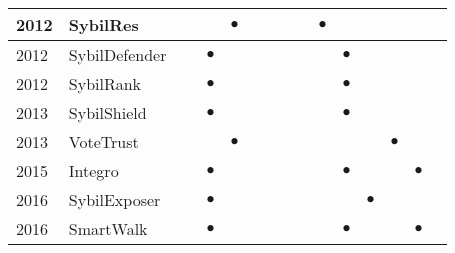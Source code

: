 \begin{table*}[]
\begin{tabular}{||l||l||c|c|c||c|c|c|c|c|c|c|c|c|c||}
  2012 & SybilRes~\cite{delaviz2012sybilres}                  &           &           & $\bullet$ &           &           &           &           & $\bullet$ &           &           &           &           &           \\ \hline
  2012 & SybilDefender~\cite{wei2012sybildefender}            &           & $\bullet$ &           &           &           &           &           &           & $\bullet$ &           &           &           &           \\ \hline
  2012 & SybilRank~\cite{cao2012aiding}                       &           & $\bullet$ &           &           &           &           &           &           & $\bullet$ &           &           &           &           \\ \hline
  2013 & SybilShield~\cite{shi2013sybilshield}                &           & $\bullet$ &           &           &           &           &           &           & $\bullet$ &           &           &           &           \\ \hline
  2013 & VoteTrust~\cite{xue2013votetrust}                    &           &           & $\bullet$ &           &           &           &           &           &           &           & $\bullet$ &           &           \\ \hline
  2015 & Integro~\cite{boshmaf2015integro}                    &           & $\bullet$ &           &           &           &           &           &           & $\bullet$ &           &           & $\bullet$ &           \\ \hline
  2016 & SybilExposer~\cite{misra2016sybilexposer}            &           & $\bullet$ &           &           &           &           &           &           &           & $\bullet$ &           &           &           \\ \hline
  2016 & SmartWalk~\cite{liu2016smartwalk}                    &           & $\bullet$ &           &           &           &           &           &           & $\bullet$ &           &           & $\bullet$ &           \\ \bottomrule
\end{tabular}
\end{table*}
                                                                                                   
